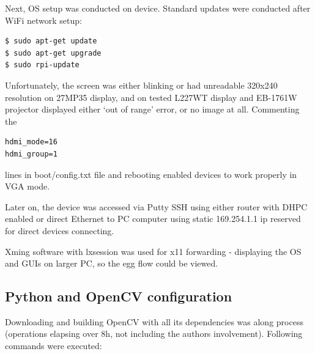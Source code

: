 \documentclass[12pt,twoside,a4paper]{article}
\begin{document}
Next, OS setup was conducted on device.
Standard updates were conducted after WiFi network setup:
\begin{lstlisting}
$ sudo apt-get update
$ sudo apt-get upgrade
$ sudo rpi-update
\end{lstlisting}

\newpage 

Unfortunately, the screen was either blinking or had unreadable 320x240 resolution on 27MP35 display, and on tested L227WT display and EB-1761W projector displayed either ‘out of range’ error, or no image at all.
Commenting the 
\begin{lstlisting}
hdmi_mode=16
hdmi_group=1 
\end{lstlisting}
lines in boot/config.txt file and rebooting enabled devices to work properly in VGA mode.

Later on, the device was accessed via Putty SSH using either router with DHPC enabled or direct Ethernet to PC computer using static 169.254.1.1 ip reserved for direct devices connecting.

Xming software with lxsession was used for x11 forwarding - displaying the OS and GUIs on larger PC, so the egg flow could be viewed.

\subsection{Python and OpenCV configuration}

Downloading and building OpenCV with all its dependencies was along process (operations elapsing over 8h, not including the authors involvement).
Following commands were executed:
\end{document}
